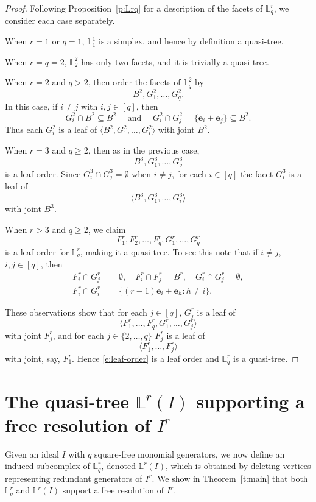 \documentclass[11pt]{article}
\theoremstyle{definition}
\numberwithin{equation}{section}
\newcommand{\LL}{\mathbb{L}}
\newcommand{\Lrq}{\mathbb{L}^r_q}
\newcommand{\Lr}{\mathbb{L}^r}
\newcommand{\tuple}[1]{\langle #1 \rangle}
\newcommand{\be}{\mathbf{e}}
\newcommand{\qand}{\quad \mbox{ and } \quad }
\begin{document}
\begin{proof}    Following Proposition~\ref{p:Lrq} for a description of the
facets of $\Lrq$, we consider each case separately.

When $r=1$ or $q=1$, $\LL^1_1$ is a simplex,
and hence by definition a quasi-tree.

When $r = q = 2$,  $\LL^2_2$ has only two
facets, and it is trivially a quasi-tree.

When $r=2$ and $q > 2$, then  order the
facets of $\LL^2_q$ by $$B^2, G^2_1, \ldots, G^2_q.$$ In this case,
if $i \neq j$ with $i,j \in [q]$, then
$$G^2_i \cap B^2 \subseteq B^2\qand G^2_i \cap G^2_j= \{\be_i + \be_j\}
\subseteq B^2.$$ Thus each $G^2_i$ is a leaf of $\tuple{B^2, G^2_1,
\ldots, G^2_i}$ with joint $B^2$.


When $r = 3$ and $q \geq 2$, then as in the previous case,
$$B^3, G^3_1, \ldots, G^3_q$$ is
a leaf order.  Since $G^3_i \cap G^3_j= \emptyset$ when $i
\neq j$, for each $i \in [q]$ the facet $G^3_i$ is a leaf of $$\langle B^3,
G^3_1, \ldots, G^3_i \rangle$$ with joint $B^3$.

When $r>3$ and $q \geq 2$, we claim
\begin{equation}\label{e:leaf-order}
F^r_1, F^r_2, \dots, F^r_q, G^r_1,\dots, G^r_q
\end{equation} is a leaf order for $\Lrq$, making it a quasi-tree.
To see this note that if $i\neq j$, $i,j\in [q]$, then
\begin{align*}
F^r_i\cap G^r_j& =\emptyset, \quad  F^r_i\cap F^r_j=B^r, \quad
G^r_i\cap G^r_j= \emptyset,  \\ 
F^r_i \cap G^r_i & = \{(r-1)\be_i + \be_h \colon h \neq i \}.
\end{align*}

These observations show that for each $j\in [q]$, $G^r_j$ is a leaf
of $$\langle F^r_1, \dots, F^r_q, G^r_1, \ldots, G^r_{j}\rangle$$
with joint $F^r_{j}$, and for each $j\in \{2,\ldots, q\}$ $F^r_j$
is a leaf of $$\langle F^r_1, \ldots, F^r_j\rangle$$ with
joint, say, $F^r_{1}$. Hence \eqref{e:leaf-order} is a leaf order
and $\Lrq$ is a quasi-tree.
\end{proof}

\section{The quasi-tree \texorpdfstring{$\Lr(I)$}{Lr(I)} supporting a free resolution of \texorpdfstring{$I^r$}{Ir}}
\label{sec:LrI}


Given an ideal $I$ with $q$ square-free monomial generators, we now define an induced
subcomplex of $\Lrq$, denoted $\Lr(I)$, which is obtained
by deleting vertices representing redundant generators of $I^r$.  We
show in Theorem~\ref{t:main} that both $\Lrq$ and $\Lr(I)$ support a free
resolution of $I^r$.
\end{document}
